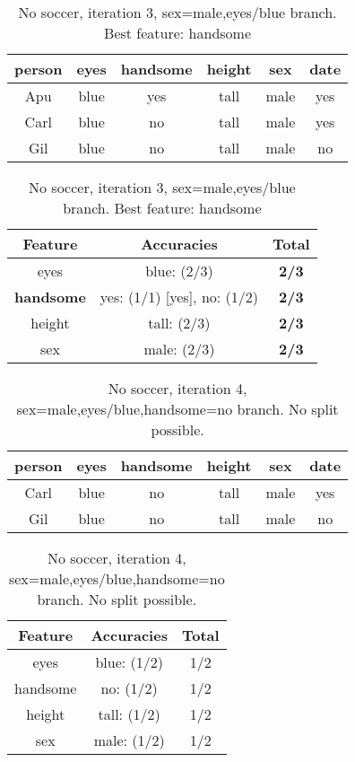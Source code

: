 \begin{table}[h!]
  \centering
  \begin{tabular}{ccccc|c}
    \toprule
    person      & eyes  & handsome & height & sex    & date\\
    \midrule
    Apu         & blue  & yes      & tall   & male   & yes \\
    Carl        & blue  & no       & tall   & male   & yes \\
    Gil         & blue  & no       & tall   & male   & no  \\
    \bottomrule
  \end{tabular}

  \vspace{.5cm}

  \begin{tabular}{ccc}
    \toprule
    Feature           & Accuracies                  & Total\\
    \midrule
    eyes              & blue: (2/3)                 & \textbf{2/3}\\
    \textbf{handsome} & yes: (1/1) [yes], no: (1/2) & \textbf{2/3}\\
    height            & tall: (2/3)                 & \textbf{2/3}\\
    sex               & male: (2/3)                 & \textbf{2/3}\\
    \bottomrule
  \end{tabular}
  \caption*{No soccer, iteration 3, sex=male,eyes/blue branch. Best feature: handsome}
\end{table}

\begin{table}[h!]
  \centering
  \begin{tabular}{ccccc|c}
    \toprule
    person      & eyes  & handsome & height & sex    & date\\
    \midrule
    Carl        & blue  & no       & tall   & male   & yes \\
    Gil         & blue  & no       & tall   & male   & no  \\
    \bottomrule
  \end{tabular}

  \vspace{.5cm}

  \begin{tabular}{ccc}
    \toprule
    Feature           & Accuracies                  & Total\\
    \midrule
    eyes              & blue: (1/2)                 & 1/2\\
    handsome          & no: (1/2)                   & 1/2\\
    height            & tall: (1/2)                 & 1/2\\
    sex               & male: (1/2)                 & 1/2\\
    \bottomrule
  \end{tabular}
  \caption*{No soccer, iteration 4, sex=male,eyes/blue,handsome=no branch.
  No split possible.}
\end{table}

